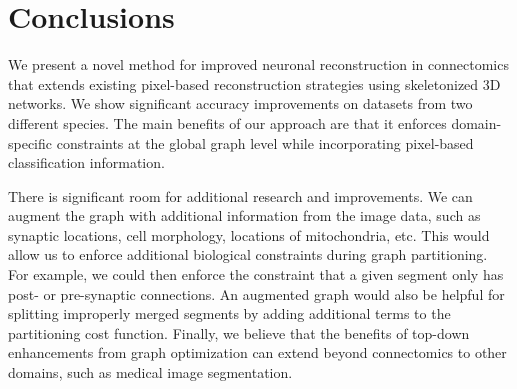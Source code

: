 \section{Conclusions}

We present a novel method for improved neuronal reconstruction in connectomics that extends existing pixel-based reconstruction strategies using skeletonized 3D networks. We show significant accuracy improvements on datasets from two different species. The main benefits of our approach are that it enforces domain-specific constraints at the global graph level while incorporating pixel-based classification information.

There is significant room for additional research and improvements. We can augment the graph with additional information from the image data, such as synaptic locations, cell morphology, locations of mitochondria, etc. This would allow us to enforce additional biological constraints during graph partitioning. For example, we could then enforce the constraint that a given segment only has post- or pre-synaptic connections. An augmented graph would also be helpful for splitting improperly merged segments by adding additional terms to the partitioning cost function. Finally, we believe that the benefits of top-down enhancements from graph optimization can extend beyond connectomics to other domains, such as medical image segmentation.